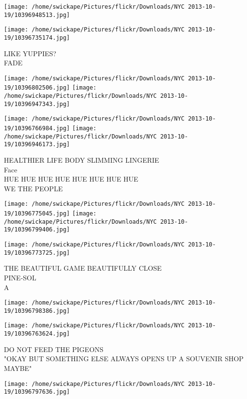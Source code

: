 \documentclass[10pt,letterpaper]{article}
\begin{document}
\texttt{[image: /home/swickape/Pictures/flickr/Downloads/NYC 2013-10-19/10396948513.jpg]}

\vspace{0.25in}
\texttt{[image: /home/swickape/Pictures/flickr/Downloads/NYC 2013-10-19/10396735174.jpg]}

LIKE YUPPIES?\\
FADE\\
\pagebreak

\texttt{[image: /home/swickape/Pictures/flickr/Downloads/NYC 2013-10-19/10396802506.jpg]}
\texttt{[image: /home/swickape/Pictures/flickr/Downloads/NYC 2013-10-19/10396947343.jpg]}

\texttt{[image: /home/swickape/Pictures/flickr/Downloads/NYC 2013-10-19/10396766984.jpg]}
\texttt{[image: /home/swickape/Pictures/flickr/Downloads/NYC 2013-10-19/10396946173.jpg]}

HEALTHIER LIFE BODY SLIMMING LINGERIE\\
Face\\
HUE HUE HUE HUE HUE HUE HUE HUE\\
WE THE PEOPLE\\
\pagebreak

\texttt{[image: /home/swickape/Pictures/flickr/Downloads/NYC 2013-10-19/10396775045.jpg]}
\texttt{[image: /home/swickape/Pictures/flickr/Downloads/NYC 2013-10-19/10396799406.jpg]}

\texttt{[image: /home/swickape/Pictures/flickr/Downloads/NYC 2013-10-19/10396773725.jpg]}

THE BEAUTIFUL GAME BEAUTIFULLY CLOSE\\
PINE{-}SOL\\
A\\
\pagebreak

\texttt{[image: /home/swickape/Pictures/flickr/Downloads/NYC 2013-10-19/10396798386.jpg]}

\vspace{0.25in}
\texttt{[image: /home/swickape/Pictures/flickr/Downloads/NYC 2013-10-19/10396763624.jpg]}

DO NOT FEED THE PIGEONS\\
"OKAY BUT SOMETHING ELSE ALWAYS OPENS UP A SOUVENIR SHOP MAYBE"\\
\pagebreak

\texttt{[image: /home/swickape/Pictures/flickr/Downloads/NYC 2013-10-19/10396797636.jpg]}
\end{document}
